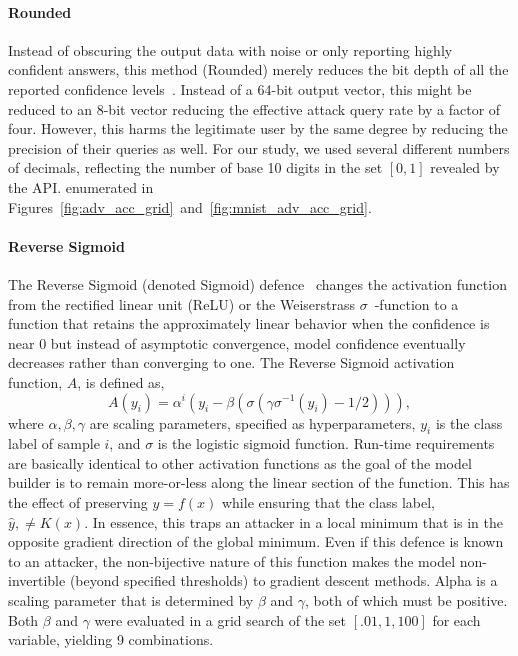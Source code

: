 \documentclass[journal]{IEEEtran}
\begin{document}
\paragraph{Rounded}
Instead of obscuring the output data with noise or only reporting highly confident answers, this method (Rounded) merely reduces the bit depth of all the reported confidence levels~\cite{discretization}.
Instead of a 64-bit output vector, this might be reduced to an 8-bit vector reducing the effective attack query rate by a factor of four.
However, this harms the legitimate user by the same degree by reducing the precision of their queries as well.
For our study, we used several different numbers of decimals, reflecting the number of base 10 digits in the set $[0,1]$ revealed by the API\@.
enumerated in Figures~\ref{fig:adv_acc_grid}~and~\ref{fig:mnist_adv_acc_grid}.


\paragraph{Reverse Sigmoid}
The Reverse Sigmoid (denoted Sigmoid) defence~\cite{reverse_sigmoid} changes the activation function from the rectified linear unit (ReLU) or the Weiserstrass $\sigma \!\!$~-function to a function that retains the approximately linear behavior when the confidence is near 0 but instead of asymptotic convergence, model confidence eventually decreases rather than converging to one.
The Reverse Sigmoid activation function, $A$, is defined as,
$$
    A(y_i) = \alpha ^i (y_i - \beta(\sigma(\gamma \sigma^{-1}(y_i) - 1/2))),
$$
where $\alpha, \beta, \gamma$ are scaling parameters, specified as hyperparameters, $y_i$ is the class label of sample $i$, and $\sigma$ is the logistic sigmoid function.
Run-time requirements are basically identical to other activation functions as the goal of the model builder is to remain more-or-less along the linear section of the function.
This has the effect of preserving $y = f(x)$ while ensuring that the class label, $\hat{y},  \neq K(x)$.
In essence, this traps an attacker in a local minimum that is in the opposite gradient direction of the global minimum.
Even if this defence is known to an attacker, the non-bijective nature of this function makes the model non-invertible (beyond specified thresholds) to gradient descent methods.
Alpha is a scaling parameter that is determined by $\beta$ and $\gamma$, both of which must be positive.
Both $\beta$ and $\gamma$ were evaluated in a grid search of the set $[.01, 1, 100]$ for each variable, yielding 9 combinations.
\end{document}
